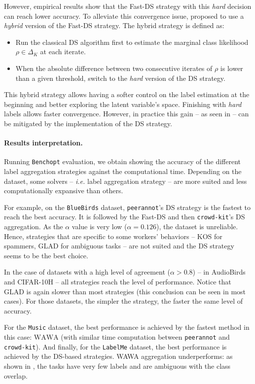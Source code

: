 However, empirical results show that the Fast-DS strategy with this \emph{hard} decision can reach lower accuracy.
To alleviate this convergence issue, \citet{sinha2018fast} proposed to use a \emph{hybrid} version of the Fast-DS strategy.
The hybrid strategy is defined as:
\begin{itemize}
    \item Run the classical DS algorithm first to estimate the marginal class likelihood $\rho\in\Delta_K$ at each iterate.
    \item When the absolute difference between two consecutive iterates of $\rho$ is lower than a given threshold, switch to the \emph{hard} version of the DS strategy.
\end{itemize}
This hybrid strategy allows having a softer control on the label estimation at the beginning and better exploring the latent variable's space.
Finishing with \emph{hard} labels allows faster convergence.
However, in practice this gain -- as seen in  -- can be mitigated by the implementation of the DS strategy.

\paragraph{Results interpretation.}
Running \texttt{Benchopt} evaluation, we obtain  showing the accuracy of the different label aggregation strategies against the computational time.
Depending on the dataset, some solvers -- \emph{i.e.} label aggregation strategy -- are more suited and less computationally expansive than others.

For example, on the \texttt{BlueBirds} dataset, \texttt{peerannot}'s DS strategy is the fastest to reach the best accuracy. It is followed by the Fast-DS and then \texttt{crowd-kit}'s DS aggregation.
As the $\alpha$ value is very low ($\alpha=0.126$), the dataset is unreliable.
Hence, strategies that are specific to some workers' behaviors -- KOS for spammers, GLAD for ambiguous tasks -- are not suited and the DS strategy seems to be the best choice.

In the case of datasets with a high level of agreement ($\alpha>0.8$) -- in AudioBirds and CIFAR-10H -- all strategies reach the level of performance. Notice that GLAD is again slower than most strategies (this conclusion can be seen in most cases). For those datasets, the simpler the strategy, the faster the same level of accuracy.

For the \texttt{Music} dataset, the best performance is achieved by the fastest method in this case: $\mathrm{WAWA}$ (with similar time computation between \texttt{peerannot} and \texttt{crowd-kit}).
And finally, for the \texttt{LabelMe} dataset, the best performance is achieved by the DS-based strategies.
WAWA aggregation underperforms: as shown in , the tasks have very few labels and are ambiguous with the class overlap.

